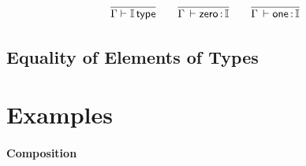\documentclass[11pt]{article}
\theoremstyle{plain}
\begin{document}
\[
\begin{array}{c}
\infer{\wftp{\Gamma}{\I}}
      {}
\qquad
\infer{\oftp{\Gamma}{\Iz}{\I}}{}
\qquad
\infer{\oftp{\Gamma}{\Io}{\I}}{}
\end{array}
\]


\subsection{Equality of Elements of Types}



\section{Examples}

\paragraph{Composition}


\end{document}
